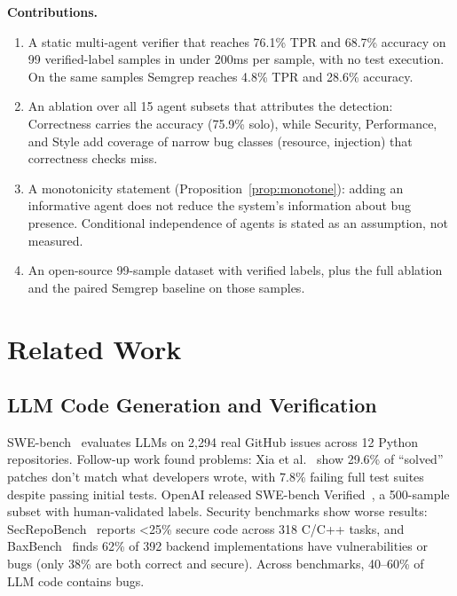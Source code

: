 \documentclass[10pt,twocolumn]{article}
\begin{document}
\textbf{Contributions.}
\begin{enumerate}[leftmargin=*, itemsep=0pt]
    \item A static multi-agent verifier that reaches 76.1\% TPR and 68.7\% accuracy on 99 verified-label samples in under 200ms per sample, with no test execution. On the same samples Semgrep reaches 4.8\% TPR and 28.6\% accuracy.

    \item An ablation over all 15 agent subsets that attributes the detection: Correctness carries the accuracy (75.9\% solo), while Security, Performance, and Style add coverage of narrow bug classes (resource, injection) that correctness checks miss.

    \item A monotonicity statement (Proposition~\ref{prop:monotone}): adding an informative agent does not reduce the system's information about bug presence. Conditional independence of agents is stated as an assumption, not measured.

    \item An open-source 99-sample dataset with verified labels, plus the full ablation and the paired Semgrep baseline on those samples.
\end{enumerate}


\section{Related Work}

\subsection{LLM Code Generation and Verification}

SWE-bench~\cite{jimenez2024swebench} evaluates LLMs on 2,294 real GitHub issues across 12 Python repositories. Follow-up work found problems: Xia et al.~\cite{xia2025swebench} show 29.6\% of ``solved'' patches don't match what developers wrote, with 7.8\% failing full test suites despite passing initial tests. OpenAI released SWE-bench Verified~\cite{openai2024verified}, a 500-sample subset with human-validated labels. Security benchmarks show worse results: SecRepoBench~\cite{dilgren2025secrepobench} reports <25\% secure code across 318 C/C++ tasks, and BaxBench~\cite{vero2025baxbench} finds 62\% of 392 backend implementations have vulnerabilities or bugs (only 38\% are both correct and secure). Across benchmarks, 40--60\% of LLM code contains bugs.
\end{document}
